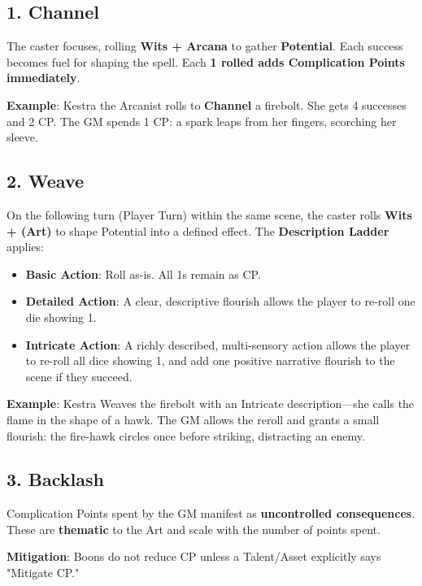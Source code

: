 \subsection*{1. Channel}

The caster focuses, rolling \textbf{Wits + Arcana} to gather \textbf{Potential}. Each success becomes fuel for shaping the spell. Each \textbf{1 rolled adds Complication Points immediately}.

\textbf{Example}: Kestra the Arcanist rolls to \textbf{Channel} a firebolt. She gets 4 successes and 2 CP. The GM spends 1 CP: a spark leaps from her fingers, scorching her sleeve.

\subsection*{2. Weave}

On the following turn (Player Turn) within the same scene, the caster rolls \textbf{Wits + (Art)} to shape Potential into a defined effect. The \textbf{Description Ladder} applies:

\begin{itemize}
    \item \textbf{Basic Action}: Roll as-is. All 1s remain as CP.
    \item \textbf{Detailed Action}: A clear, descriptive flourish allows the player to re-roll one die showing 1.
    \item \textbf{Intricate Action}: A richly described, multi-sensory action allows the player to re-roll all dice showing 1, and add one positive narrative flourish to the scene if they succeed.
\end{itemize}

\textbf{Example}: Kestra Weaves the firebolt with an Intricate description---she calls the flame in the shape of a hawk. The GM allows the reroll and grants a small flourish: the fire-hawk circles once before striking, distracting an enemy.

\subsection*{3. Backlash}

Complication Points spent by the GM manifest as \textbf{uncontrolled consequences}. These are \textbf{thematic} to the Art and scale with the number of points spent.

\textbf{Mitigation}: Boons do not reduce CP unless a Talent/Asset explicitly says "Mitigate CP."

